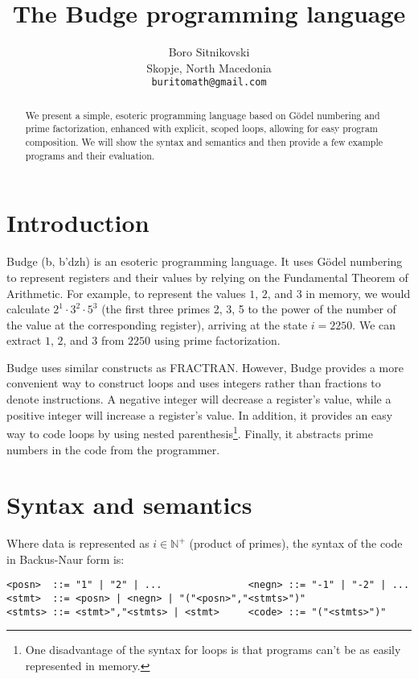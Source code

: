 \documentclass{article}
\title{The Budge programming language}
\author{
  Boro Sitnikovski \\
  Skopje, North Macedonia \\
  \texttt{buritomath@gmail.com} \\
}
\begin{document}
\maketitle

\begin{abstract}
We present a simple, esoteric programming language based on Gödel numbering and prime factorization, enhanced with explicit, scoped loops, allowing for easy program composition. We will show the syntax and semantics and then provide a few example programs and their evaluation.
\end{abstract}


\section{Introduction}

Budge (b\textturnv\textdyoghlig, b'dzh) is an esoteric programming language. It uses Gödel numbering\cite{b1} to represent registers and their values by relying on the Fundamental Theorem of Arithmetic\cite{b2}. For example, to represent the values $1$, $2$, and $3$ in memory, we would calculate $2^1 \cdot 3^2 \cdot 5^3$ (the first three primes 2, 3, 5 to the power of the number of the value at the corresponding register), arriving at the state $i = 2250$. We can extract $1$, $2$, and $3$ from $2250$ using prime factorization.

Budge uses similar constructs as FRACTRAN\cite{b3}. However, Budge provides a more convenient way to construct loops and uses integers rather than fractions to denote instructions. A negative integer will decrease a register's value, while a positive integer will increase a register's value. In addition, it provides an easy way to code loops by using nested parenthesis\footnote{One disadvantage of the syntax for loops is that programs can't be as easily represented in memory.}. Finally, it abstracts prime numbers in the code from the programmer.

\section{Syntax and semantics}

Where data is represented as $i \in \mathbb{N^+}$ (product of primes), the syntax of the code in Backus-Naur form\cite{b4} is:

\begin{verbatim}
<posn>  ::= "1" | "2" | ...               <negn> ::= "-1" | "-2" | ...
<stmt>  ::= <posn> | <negn> | "("<posn>","<stmts>")"
<stmts> ::= <stmt>","<stmts> | <stmt>     <code> ::= "("<stmts>")"
\end{verbatim}
\end{document}
